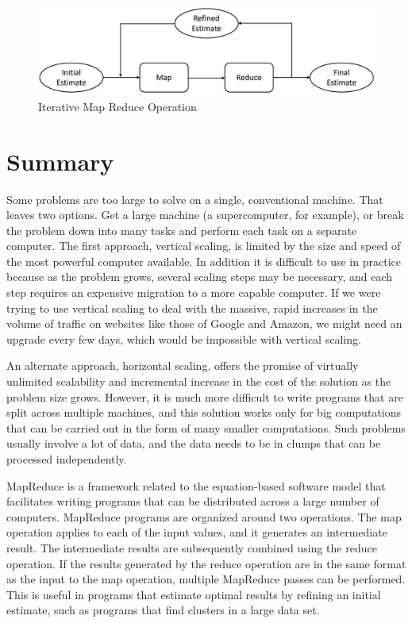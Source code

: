 \begin{figure}
    \begin{center}
        \includegraphics[scale=1]{images-cmyk/iterative-map-reduce-rev}
    \end{center}
    \caption{Iterative Map Reduce Operation}
    \label{iterative-map-reduce}
\end{figure}

\section{Summary}

Some problems are too large to solve on a single, conventional machine.
That leaves two options.
Get a large machine (a supercomputer, for example),
or break the problem down into many tasks and
perform each task on a separate computer.
The first approach,
vertical scaling,
is limited by the size and speed of the most powerful computer available.
In addition it is difficult to use in practice because as the problem grows,
several scaling steps may be necessary,
and each step requires an expensive migration to a more capable computer.
If we were trying to use vertical scaling to deal with the massive,
rapid increases in the volume of traffic on websites
like those of Google and Amazon,
we might need an upgrade every few days,
which would be impossible with vertical scaling.

An alternate approach,
horizontal scaling,
offers the promise of virtually unlimited
scalability and incremental increase
in the cost of the solution as the problem size grows.
However, it is much more difficult
to write programs that are split across multiple machines,
and this solution works only
for big computations that can be carried out
in the form of many smaller computations.
Such problems usually involve a lot of data,
and the data needs to be in clumps
that can be processed independently.

MapReduce
is a framework related
to the equation-based software model that facilitates writing
programs that can be distributed across a large number of computers.
MapReduce programs are organized around two operations.
The map operation applies to each of the input values, and
it generates an intermediate result.
The intermediate results are subsequently combined using the reduce operation.
If the results generated by the reduce operation are in the same format
as the input to the map operation, multiple MapReduce passes can be performed.
This is useful in programs that estimate optimal results by refining an initial estimate,
such as programs that find clusters in a large data set.


